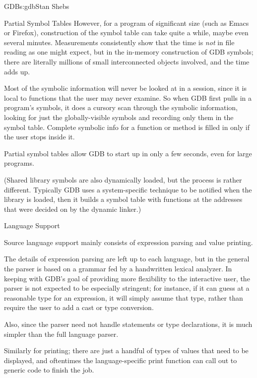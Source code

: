 \begin{aosachapter}{GDB}{s:gdb}{Stan Shebs}
\begin{aosasect2}{Partial Symbol Tables}
However, for a program of significant size (such as Emacs or Firefox),
construction of the symbol table can take quite a while, maybe even
several minutes.  Measurements consistently show that the time is
{\em not} in file reading as one might expect, but in the in-memory
construction of GDB symbols; there are literally millions of small
interconnected objects involved, and the time adds up.

Most of the symbolic information will never be looked at in a session,
since it is local to functions that the user may never examine.  So
when GDB first pulls in a program's symbols, it does a cursory scan
through the symbolic information, looking for just the
globally-visible symbols and recording only them in the symbol table.
Complete symbolic info for a function or method is filled in only if
the user stops inside it.

Partial symbol tables allow GDB to start up in only a few seconds, even
for large programs.

(Shared library symbols are also dynamically loaded, but the process
is rather different.  Typically GDB uses a system-specific technique
to be notified when the library is loaded, then it builds a symbol
table with functions at the addresses that were decided on by the
dynamic linker.)

\end{aosasect2}

\begin{aosasect2}{Language Support}

Source language support mainly consists of expression parsing and value
printing.

The details of expression parsing are left up to each language, but in
the general the parser is based on a  grammar fed by a
handwritten lexical analyzer.  In keeping with GDB's goal of providing
more flexibility to the interactive user, the parser is not expected
to be especially stringent; for instance, if it can guess at a
reasonable type for an expression, it will simply assume that type,
rather than require the user to add a cast or type conversion.

Also, since the parser need not handle statements or type
declarations, it is much simpler than the full language parser.

Similarly for printing; there are just a handful of types of values
that need to be displayed, and oftentimes the language-specific print
function can call out to generic code to finish the job.


\end{aosasect2}
\end{aosachapter}
